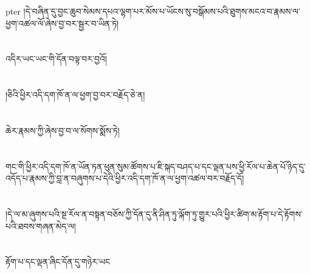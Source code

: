 pter{ }།དེ་བཞིན་དུ་བྱང་ཆུབ་སེམས་དཔའ་ལྷག་པར་མོས་པ་ཡོངས་སུ་བསྒོམས་པའི་ཐུགས་མངའ་བ་རྣམས་ལ་ཕྱག་འཚལ་ལོ་ཞེས་བྱ་བར་སྦྱར་བ་ཡིན་ཏེ།\chapter{ }འདིར་ཡང་ཡང་གི་དོན་བལྟ་བར་བྱའོ།\chapter{ }།ཅིའི་ཕྱིར་འདི་དག་ཁོ་ན་ལ་ཕྱག་བྱ་བར་བརྗོད་ཅེ་ན།\chapter{ }ཆེར་རྣམས་ཀྱི་ཞེས་བྱ་བ་ལ་སོགས་སྨོས་ཏེ།\chapter{ }གང་གི་ཕྱིར་འདི་དག་ཁོ་ན་ཡོན་ཏན་ཕུན་སུམ་ཚོགས་པ་ཇི་སྐད་བཤད་པ་དང་ལྡན་པས་ཕྱི་རོལ་པ་ཆེན་པོ་ཉིད་དུ་འདོད་པ་རྣམས་ཀྱི་བླ་ན་བཞུགས་པ་དེའི་ཕྱིར་འདི་དག་ཁོ་ན་ལ་ཕྱག་འཚལ་བར་བརྗོད་དོ།\chapter{ }།དེ་ལ་མ་ཞུགས་པའི་སྔ་རོལ་ན་བསྟན་བཅོས་ཀྱི་དོན་དུ་ནི་ཤིན་ཏུ་ལྐོག་ཏུ་གྱུར་པའི་ཕྱིར་ཚིག་མ་རྟོག་པ་དེ་རྟོགས་པའི་ཐབས་གཞན་མེད་ལ།\chapter{ }རྟོག་པ་དང་ལྡན་ཞིང་དོན་དུ་གཉེར་ཡང